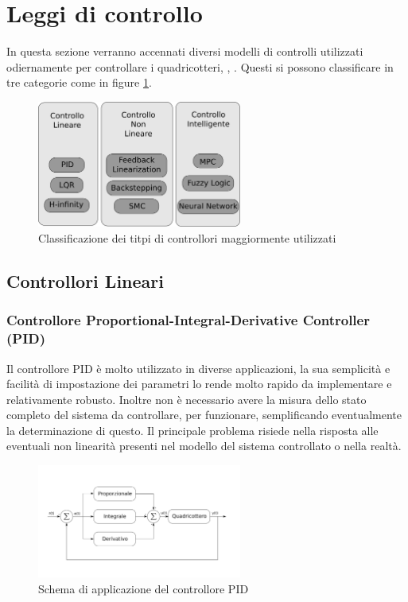 \section{Leggi di controllo}
In questa sezione verranno accennati diversi modelli di controlli utilizzati odiernamente per controllare i quadricotteri, \cite{ZuluAndrew2014ARoC}, \cite{KimJinho2020ACSo}. Questi si possono classificare in tre categorie come in figure \ref{fig:categoriecontrolli}.
\begin{figure}
	\centering
	\includegraphics[width=0.6\textwidth]{SistemaQuadrirotore/Figure/Classificazione}
	\caption{Classificazione dei titpi di controllori maggiormente utilizzati}
	\label{fig:categoriecontrolli}
\end{figure}

\subsection{Controllori Lineari}
\subsubsection{Controllore Proportional-Integral-Derivative Controller (PID)}
Il controllore PID è molto utilizzato in diverse applicazioni, la sua semplicità e facilità di impostazione dei parametri lo rende molto rapido da implementare e relativamente robusto. Inoltre non è necessario avere la misura dello stato completo del sistema da controllare, per funzionare, semplificando eventualmente la determinazione di questo. Il principale problema risiede nella risposta alle eventuali non linearità presenti nel modello del sistema controllato o nella realtà.

\begin{figure}
	\centering
	\includegraphics[width=0.6\textwidth]{SistemaQuadrirotore/Figure/PID}
	\caption{Schema di applicazione del controllore PID}
\end{figure}

